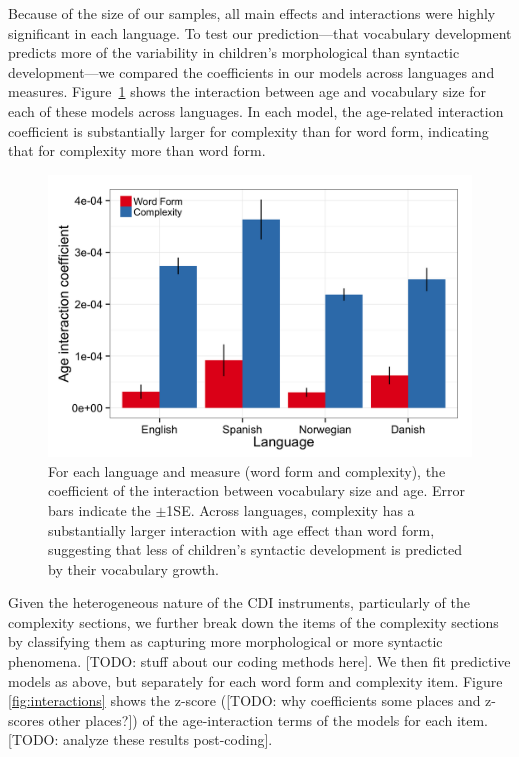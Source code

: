 \documentclass[10pt,letterpaper]{article}
\begin{document}
Because of the size of our samples, all main effects and interactions were highly significant in each language. To test our prediction---that vocabulary development predicts more of the variability in children's morphological than syntactic development---we compared the coefficients in our models across languages and measures. Figure~\ref{fig:coefs_grammar} shows the interaction between age and vocabulary size for each of these models across languages. In each model, the age-related interaction coefficient is substantially larger for complexity than for word form, indicating that for complexity more than word form.

\begin{figure}[tb]
\begin{center}
\includegraphics[width=\linewidth]{plots/coefs_wordform_complexity.png}
\end{center}
\caption{\label{fig:coefs_grammar}  For each language and measure (word form and complexity), the coefficient of the interaction between vocabulary size and age. Error bars indicate the $\pm$1SE. Across languages, complexity has a substantially larger interaction with age effect than word form, suggesting that less of children's syntactic development is predicted by their vocabulary growth.} 
\end{figure}

Given the heterogeneous nature of the CDI instruments, particularly of the complexity sections, we further break down the items of the complexity sections by classifying them as capturing more morphological or more syntactic phenomena. [TODO: stuff about our coding methods here]. We then fit predictive models as above, but separately for each word form and complexity item. Figure \ref{fig:interactions} shows the z-score ([TODO: why coefficients some places and z-scores other places?]) of the age-interaction terms of the models for each item. [TODO: analyze these results post-coding].
\end{document}
